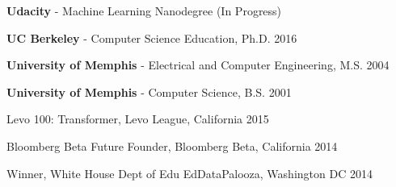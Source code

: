 \documentclass[10pt,article,oneside]{memoir}
\begin{document}
\bigskip 


\ind \textbf{Udacity} - Machine Learning Nanodegree  \hfill (In Progress)

\ind \textbf{UC Berkeley} - Computer Science Education, Ph.D. \hfill 2016

\ind \textbf{University of Memphis} - Electrical and Computer Engineering, M.S. \hfill 2004

\ind \textbf{University of Memphis} - Computer Science, B.S. \hfill 2001

\bigskip 

\medskip

\ind Levo 100: Transformer, Levo League, California \hfill 2015

\ind Bloomberg Beta Future Founder, Bloomberg Beta, California \hfill 2014 

\ind Winner, White House Dept of Edu EdDataPalooza, Washington DC \hfill 2014
\end{document}
